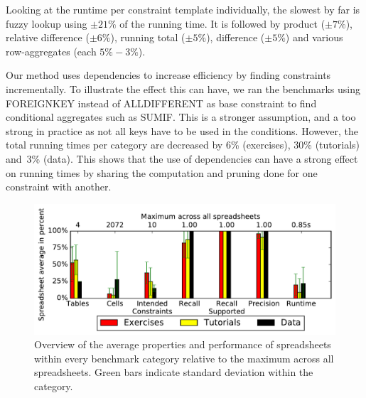 


Looking at the runtime per constraint template individually, the slowest by far is fuzzy lookup using $\pm 21\%$ of the running time.
It is followed by product ($\pm 7\%$), relative difference ($\pm 6\%$), running total ($\pm 5\%$), difference ($\pm 5\%$) and various row-aggregates (each $5\% - 3\%$).

Our method uses dependencies to increase efficiency by finding constraints incrementally. To illustrate the effect this can have, we ran the benchmarks using FOREIGNKEY instead of ALLDIFFERENT as base constraint to find conditional aggregates such as SUMIF. This is a stronger assumption, and a too strong in practice as not all keys have to be used in the conditions. However, the total running times per category are decreased by 6\% (exercises), 30\% (tutorials) and~3\% (data). This shows that the use of dependencies can have a strong effect on running times by sharing the computation and pruning done for one constraint with another.

\begin{figure}[t]
  \centering
  \includegraphics[width=1\linewidth]{figures/comparison.pdf}
  \caption{Overview of the average properties and performance of spreadsheets within every benchmark category relative to the maximum across all spreadsheets.
  Green bars indicate standard deviation within the category.}
  \label{fig:comparison}
\end{figure}


